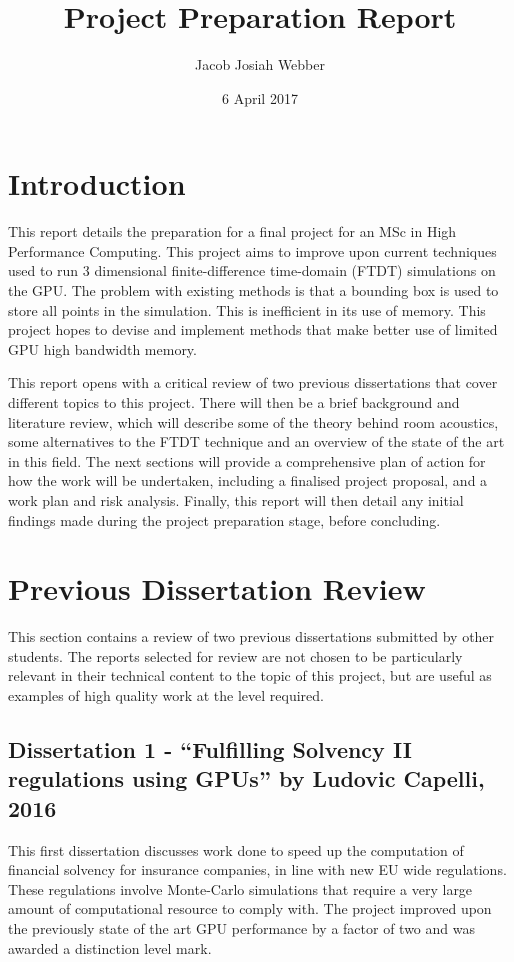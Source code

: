 \documentclass[a4paper,12pt]{article}
\begin{document}
\title{Project Preparation Report}
\author{Jacob Josiah Webber}
\date{6 April 2017}
\makeEPCCtitle

\section{Introduction}
This report details the preparation for a final project for an MSc in High Performance Computing. This project aims to improve upon current techniques used to run 3 dimensional finite-difference time-domain (FTDT) simulations on the GPU. The problem with existing methods is that a bounding box is used to store all points in the simulation. This is inefficient in its use of memory. This project hopes to devise and implement methods that make better use of limited GPU high bandwidth memory.

This report opens with a critical review of two previous dissertations that cover different topics to this project. There will then be a brief background and literature review, which will describe some of the theory behind room acoustics, some alternatives to the FTDT technique and an overview of the state of the art in this field. The next sections will provide a comprehensive plan of action for how the work will be undertaken, including a finalised project proposal, and a work plan and risk analysis. Finally, this report will then detail any initial findings made during the project preparation stage, before concluding.



\section{Previous Dissertation Review}

This section contains a review of two previous dissertations submitted by other students. The reports selected for review are not chosen to be particularly relevant in their technical content to the topic of this project, but are useful as examples of high quality work at the level required.

\subsection{Dissertation 1 - ``Fulfilling Solvency II regulations using GPUs'' by Ludovic Capelli, 2016}
This first dissertation \cite{dis1} discusses work done to speed up the computation of financial solvency for insurance companies, in line with new EU wide regulations. These regulations involve Monte-Carlo simulations that require a very large amount of computational resource to comply with. The project improved upon the previously state of the art GPU performance by a factor of two and was awarded a distinction level mark.
\end{document}
